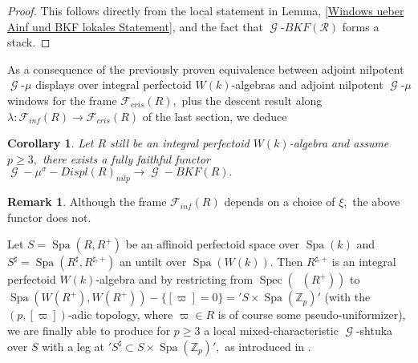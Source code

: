 \documentclass[a4paper,10,5 pt]{amsart}
\newtheorem{Corollary}[Satz]{Corollary}
\theoremstyle{definition}
\newtheorem{Remark}{Remark}
\DeclareMathOperator{\Spec}{Spec}
\DeclareMathOperator{\Spa}{Spa}
\DeclareMathOperator{\Ainf}{\mathbb{A}_{inf}}
\DeclareMathOperator{\G}{\mathcal{G}}
\begin{document}
\begin{proof}
This follows directly from the local statement in Lemma, \ref{Windows ueber Ainf und BKF lokales Statement}, and the fact that $\G$-$BKF(\mathcal{R})$ forms a stack.
\end{proof}
As a consequence of the previously proven equivalence between adjoint nilpotent $\G$-$\mu$ displays over integral perfectoid $W(k)$-algebras and adjoint nilpotent $\G$-$\mu$ windows for the frame $\mathcal{F}_{cris}(R),$ plus the descent result along $\lambda\colon \mathcal{F}_{inf}(R)\rightarrow \mathcal{F}_{cris}(R)$ of the last section, we deduce
\begin{Corollary}
Let $R$ still be an integral perfectoid $W(k)$-algebra and assume $p\geq 3,$ there exists a fully faithful functor
$\G-\mu^{\sigma}-Displ(R)_{nilp}\rightarrow \G-BKF(R).$
\end{Corollary}
\begin{Remark}
Although the frame $\mathcal{F}_{inf}(R)$ depends on a choice of $\xi,$ the above functor does not.
\end{Remark}
Let $S=\Spa(R,R^{+})$ be an affinoid perfectoid space over $\Spa(k)$ and $S^{\sharp}=\Spa(R^{\sharp},R^{\sharp,+})$ an untilt over $\Spa(W(k)).$ Then $R^{\sharp,+}$ is an integral perfectoid $W(k)$-algebra and by restricting from $\Spec(\Ainf(R^{+}))$ to $\Spa(W(R^{+}),W(R^{+}))-\lbrace [\varpi]=0 \rbrace = \prime S\times \Spa(\mathbb{Z}_{p}) \prime$ (with the $(p,[\varpi])$-adic topology, where $\varpi\in R$ is of course some pseudo-uniformizer), we are finally able to produce for $p\geq 3$ a local mixed-characteristic $\G$-shtuka over $S$ with a leg at $\prime S^{\sharp}\subset S\times \Spa(\mathbb{Z}_{p})\prime,$ as introduced in \cite{Berkeley lectures}.
\end{document}
